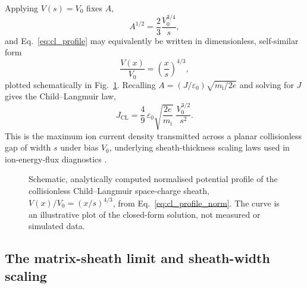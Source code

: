 Applying $V(s) = V_{0}$ fixes $A$,
\begin{equation}
A^{1/2} = \frac{2}{3}\frac{V_{0}^{3/4}}{s},
\end{equation}
and Eq.~\eqref{eq:cl_profile} may equivalently be written in dimensionless, self-similar form
\begin{equation}
\boxed{\frac{V(x)}{V_{0}} = \left(\frac{x}{s}\right)^{4/3}},
\label{eq:cl_profile_norm}
\end{equation}
plotted schematically in Fig.~\ref{fig:cl_profile}. Recalling $A = (J/\varepsilon_{0})\sqrt{m_{\mathrm{i}}/2e}$ and solving for $J$ gives the Child--Langmuir law,
\begin{equation}
\boxed{J_{\mathrm{CL}} = \frac{4}{9}\,\varepsilon_{0}\sqrt{\frac{2e}{m_{\mathrm{i}}}}\;\frac{V_{0}^{3/2}}{s^{2}}}.
\label{eq:child_langmuir}
\end{equation}
This is the maximum ion current density transmitted across a planar collisionless gap of width $s$ under bias $V_{0}$, underlying sheath-thickness scaling laws used in ion-energy-flux diagnostics \cite{ref0074,ref0075,ref0080}.

\begin{figure}[htbp]
\centering
{}
\caption{Schematic, analytically computed normalised potential profile of the collisionless Child--Langmuir space-charge sheath, $V(x)/V_{0} = (x/s)^{4/3}$, from Eq.~\eqref{eq:cl_profile_norm}. The curve is an illustrative plot of the closed-form solution, not measured or simulated data.}
\label{fig:cl_profile}
\end{figure}

\subsection{The matrix-sheath limit and sheath-width scaling}

